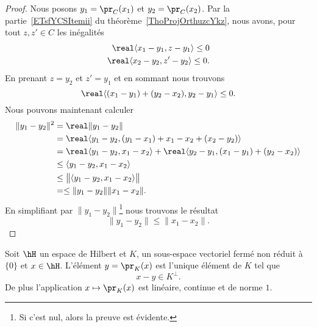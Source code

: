 \begin{proof}
	Nous posons \( y_1=\pr_C(x_1)\) et \( y_2=\pr_C(x_2)\). Par la partie~\ref{ETsfYCSItemii} du théorème~\ref{ThoProjOrthuzcYkz}, nous avons, pour tout \( z,z'\in C\) les inégalités
	\begin{subequations}
		\begin{align}
			\real\langle x_1-y_1, z-y_1\rangle \leq 0 \\
			\real\langle x_2-y_2, z'-y_2\rangle \leq 0.
		\end{align}
	\end{subequations}
	En prenant \( z=y_2\) et \( z'=y_1\) et en sommant nous trouvons
	\begin{equation}
		\real\langle (x_1-y_1)+(y_2-x_2), y_2-y_1\rangle \leq 0.
	\end{equation}
	Nous pouvons maintenant calculer
	\begin{equation}
		\begin{aligned}[]
			\| y_1-y_2 \|^2 & =\real\| y_1-y_2 \|                                                                     \\
			                & =\real\langle y_1-y_2, (y_1-x_1)+x_1-x_2+(x_2-y_2)\rangle                               \\
			                & =\real\langle y_1-y_2, x_1-x_2\rangle +\real\langle y_2-y_1, (x_1-y_1)+(y_2-x_2)\rangle \\
			                & \leq\langle y_1-y_2, x_1-x_2\rangle                                                     \\
			                & \leq\big\| \langle y_1-y_2, x_1-x_2\rangle  \big\|                                      \\
			                & =\leq \| y_1-y_2 \|\| x_1-x_2 \|.
		\end{aligned}
	\end{equation}
	En simplifiant par \( \| y_1-y_2 \|\)\footnote{Si c'est nul, alors la preuve est évidente.} nous trouvons le résultat
	\begin{equation}
		\| y_1-y_2 \|\leq \| x_1-x_2 \|.
	\end{equation}
\end{proof}

\begin{theorem}      \label{ThoMXwOjb}
	Soit \( \hH\) un espace de Hilbert et \( K\), un sous-espace vectoriel fermé non réduit à \( \{ 0 \}\) et \( x\in\hH\). L'élément \( y=\pr_K(x)\) est l'unique élément de \( K\) tel que
	\begin{equation}
		x-y\in K^{\perp}.
	\end{equation}
	De plus l'application \( x\mapsto\pr_K(x)\) est linéaire, continue et de norme \( 1\).
\end{theorem}

